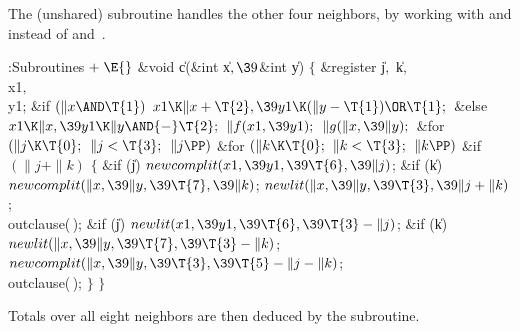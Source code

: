 The (unshared)  subroutine handles the other four neighbors,
by working with  and  instead of  and~.

\Y\B\4:Subroutines\X${}\mathrel+\E{}$\6
\&{void} \|c(\&{int} \|x${},\39{}$\&{int} \|y)\1\1\2\2\6
${}\{{}$\1\6
\&{register} \|j${},{}$ \|k${},{}$ \\{x1}${},{}$ \\{y1};\7
\&{if} ${}(\|x\AND\T{1}){}$\1\5
${}\\{x1}\K\|x+\T{2},\39\\{y1}\K(\|y-\T{1})\OR\T{1};{}$\2\6
\&{else}\1\5
${}\\{x1}\K\|x,\39\\{y1}\K\|y\AND{-}\T{2};{}$\2\6
${}\|f(\\{x1},\39\\{y1});{}$\6
${}\|g(\|x,\39\|y);{}$\6
\&{for} ${}(\|j\K\T{0};{}$ ${}\|j<\T{3};{}$ ${}\|j\PP){}$\1\6
\&{for} ${}(\|k\K\T{0};{}$ ${}\|k<\T{3};{}$ ${}\|k\PP){}$\1\6
\&{if} ${}(\|j+\|k){}$\5
${}\{{}$\1\6
\&{if} (\|j)\1\5
${}\\{newcomplit}(\\{x1},\39\\{y1},\39\T{6},\39\|j){}$;\2\6
\&{if} (\|k)\1\5
${}\\{newcomplit}(\|x,\39\|y,\39\T{7},\39\|k){}$;\2\6
${}\\{newlit}(\|x,\39\|y,\39\T{3},\39\|j+\|k){}$;\6
\\{outclause}(\,);\6
\&{if} (\|j)\1\5
${}\\{newlit}(\\{x1},\39\\{y1},\39\T{6},\39\T{3}-\|j){}$;\2%
\6
\&{if} (\|k)\1\5
${}\\{newlit}(\|x,\39\|y,\39\T{7},\39\T{3}-\|k){}$;\2\6
${}\\{newcomplit}(\|x,\39\|y,\39\T{3},\39\T{5}-\|j-\|k){}$;\6
\\{outclause}(\,);\6
\4${}\}{}$\2\2\2\6
\4${}\}{}$\2\par
\fi

Totals over all eight neighbors are then deduced by the 
subroutine.

